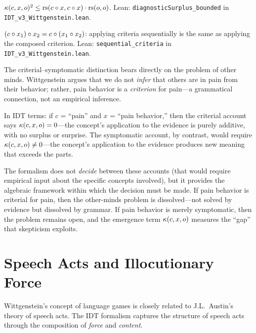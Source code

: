 \begin{theorem}
\label{thm:diagnostic-bounded}
$\kappa(c, x, o)^2 \leq \mathrm{rs}(c \circ x, c \circ x) \cdot \mathrm{rs}(o, o)$.
Lean: \texttt{diagnosticSurplus\_bounded} in
\texttt{IDT\_v3\_Wittgenstein.lean}.
\end{theorem}

\begin{theorem}
\label{thm:sequential-criteria}
$(c \circ x_1) \circ x_2 = c \circ (x_1 \circ x_2)$:
applying criteria sequentially is the same as applying the composed criterion.
Lean: \texttt{sequential\_criteria} in \texttt{IDT\_v3\_Wittgenstein.lean}.
\end{theorem}

\begin{interpretation}
The criterial--symptomatic distinction bears directly on the problem of other
minds. Wittgenstein argues that we do not \emph{infer} that others are in pain
from their behavior; rather, pain behavior is a \emph{criterion} for pain---a
grammatical connection, not an empirical inference.

In IDT terms: if $c$ = ``pain'' and $x$ = ``pain behavior,'' then the
criterial account says $\kappa(c, x, o) = 0$---the concept's application to
the evidence is purely additive, with no surplus or surprise. The symptomatic
account, by contrast, would require $\kappa(c, x, o) \neq 0$---the concept's
application to the evidence produces new meaning that exceeds the parts.

The formalism does not \emph{decide} between these accounts (that would require
empirical input about the specific concepts involved), but it provides the
algebraic framework within which the decision must be made. If pain behavior
is criterial for pain, then the other-minds problem is dissolved---not solved
by evidence but dissolved by grammar. If pain behavior is merely symptomatic,
then the problem remains open, and the emergence term $\kappa(c, x, o)$
measures the ``gap'' that skepticism exploits.
\end{interpretation}

\section{Speech Acts and Illocutionary Force}

Wittgenstein's concept of language games is closely related to J.L.~Austin's
theory of speech acts. The IDT formalism captures the structure of speech acts
through the composition of \emph{force} and \emph{content}.


